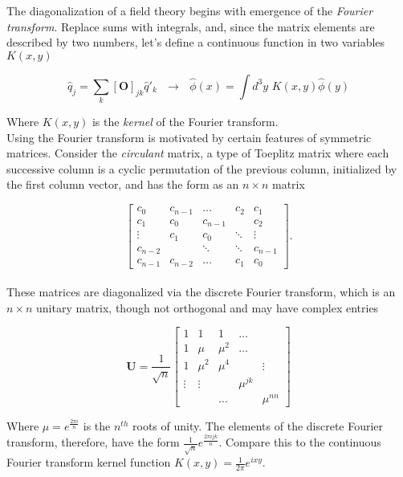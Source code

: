 \noindent The diagonalization of a field theory begins with emergence of the \textit{Fourier transform}. Replace sums with integrals, and, since the matrix elements are described by two numbers, let's define a continuous function in two variables $K(x,y)$

\begin{equation}
\hat{q}_j = \sum_k [\textbf{O}]_{jk} \hat{q}'_k \,\,\,\, \rightarrow \,\,\,\, \hat{\phi}(x) = \int d^3 y \,\, K(x, y) \hat{\phi}(y)
\end{equation}

\noindent Where $K(x,y)$ is the \textit{kernel} of the Fourier transform. \\

\noindent Using the Fourier transform is motivated by certain features of symmetric matrices. Consider the \textit{circulant} matrix, a type of Toeplitz matrix where each successive column is a cyclic permutation of the previous column, initialized by the first column vector, and has the form as an $n \times n$ matrix 

\begin{equation}
\begin{bmatrix} 
 c_0 & c_{n-1} & \dots & c_2 & c_1 \\
 c_1 & c_0 & c_{n-1} &  & c_2 \\
 \vdots & c_1 & c_0 &  \ddots & \vdots \\
 c_{n-2} &  & \ddots &  \ddots & c_{n-1} \\
 c_{n-1} & c_{n-2} & \dots &  c_1 & c_0 
\end{bmatrix}.
\end{equation} \\

\noindent These matrices are diagonalized via the discrete Fourier transform, which is an $n \times n$ unitary matrix, though not orthogonal and may have complex entries

\begin{equation}
\textbf{U} = \frac{1}{\sqrt{n}} 
\begin{bmatrix} 
 1 & 1 & 1 & \dots &  \\
 1 & \mu & \mu^2 & \dots &  \\
 1 & \mu^2 & \mu^4 &   & \vdots \\
 \vdots & \vdots & &  \mu^{jk} &  \\
  &  & \dots &  & \mu^{nn} 
\end{bmatrix}
\end{equation}


\noindent Where $\mu = e^{\frac{2 \pi i}{n}}$ is the $n^{th}$ roots of unity. The elements of the discrete Fourier transform, therefore, have the form $\frac{1}{\sqrt{n}} e^{\frac{2\pi i j k}{n}}$. Compare this to the continuous Fourier transform kernel function $K(x,y) = \frac{1}{2\pi} e^{ixy}$. \\

